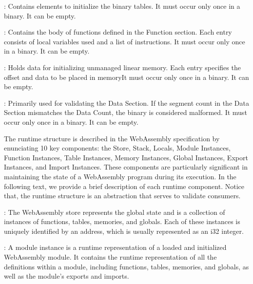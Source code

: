 : Contains elements to initialize the binary tables. It must occur only once in a binary. It can be empty.

: Contains the body of functions defined in the Function section. Each entry consists of local variables used and a list of instructions. It must occur only once in a binary. It can be empty.

: Holds data for initializing unmanaged linear memory. Each entry specifies the offset and data to be placed in memoryIt must occur only once in a binary. It can be empty.

: Primarily used for validating the Data Section. If the segment count in the Data Section mismatches the Data Count, the binary is considered malformed. It must occur only once in a binary. It can be empty.





\label{background:wasm:execution}


The \Wasm runtime structure is described in the WebAssembly specification by enunciating 10 key components: the Store, Stack, Locals, Module Instances, Function Instances, Table Instances, Memory Instances, Global Instances, Export Instances, and Import Instances. 
These components are particularly significant in maintaining the state of a WebAssembly program during its execution. 
In the following text, we provide a brief description of each runtime component.
Notice that, the runtime structure is an abstraction that serves to validate \wasm consumers.

: The WebAssembly store represents the global state and is a collection of instances of functions, tables, memories, and globals. Each of these instances is uniquely identified by an address, which is usually represented as an i32 integer.


: A module instance is a runtime representation of a loaded and initialized WebAssembly module. 
It contains the runtime representation of all the definitions within a module, including functions, tables, memories, and globals, as well as the module's exports and imports.


